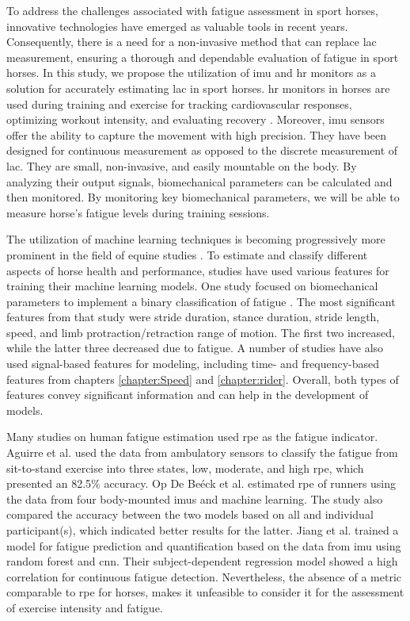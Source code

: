 To address the challenges associated with fatigue assessment in sport horses, innovative technologies have emerged as valuable tools in recent years. Consequently,  there is a need for a non-invasive method that can replace \gls{lac} measurement, ensuring a thorough and dependable evaluation of fatigue in sport horses. In this study, we propose the utilization of \gls{imu} and \gls{hr} monitors as a solution for accurately estimating \gls{lac} in sport horses. \gls{hr} monitors in horses are used during training and exercise for tracking cardiovascular responses, optimizing workout intensity, and evaluating recovery \cite{munsters_2014_exercise}. Moreover, \gls{imu} sensors offer the ability to capture the movement with high precision. They have been designed for continuous measurement as opposed to the discrete measurement of \gls{lac}. They are small, non-invasive, and easily mountable on the body. By analyzing their output signals, biomechanical parameters can be calculated and then monitored. By monitoring key biomechanical parameters, we will be able to measure horse's fatigue levels during training sessions. 


The utilization of machine learning techniques is becoming progressively more prominent in the field of equine studies \cite{Alexeenko}. To estimate and classify different aspects of horse health and performance, studies have used various features for training their machine learning models. One study focused on biomechanical parameters to implement a binary classification of fatigue \cite{munsters_2014_exercise}. The most significant features from that study were stride duration, stance duration, stride length, speed, and limb protraction/retraction range of motion. The first two increased, while the latter three decreased due to fatigue. A number of studies have also used signal-based features for modeling, including time- and frequency-based features from chapters \ref{chapter:Speed} and \ref{chapter:rider}. Overall, both types of features convey significant information and can help in the development of models.

Many studies on human fatigue estimation used \gls{rpe} as the fatigue indicator. Aguirre et al. \cite{Aguirre2021-ab} used the data from ambulatory sensors to classify the fatigue from sit-to-stand exercise into three states, low, moderate, and high \gls{rpe}, which presented an 82.5\% accuracy. Op De Beéck et al. \cite{OpDeBeeck2018pq} estimated \gls{rpe} of runners using the data from four body-mounted \gls{imu}s and machine learning. The study also compared the accuracy between the two models based on all and individual participant(s), which indicated better results for the latter. Jiang et al. \cite{Jiang2021-cd} trained a model for fatigue prediction and quantification based on the data from \gls{imu} using random forest and \gls{cnn}. Their subject-dependent regression model showed a high correlation for continuous fatigue detection. Nevertheless, the absence of a metric comparable to \gls{rpe} for horses, makes it unfeasible to consider it for the assessment of exercise intensity and fatigue.

